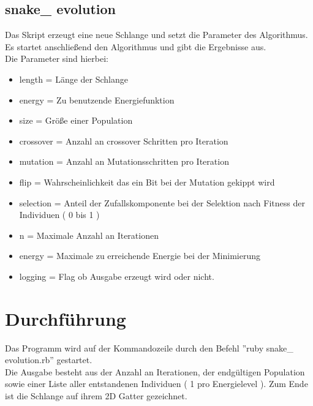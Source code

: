 \documentclass[a4paper,10pt,fleqn]{scrartcl}
\begin{document}
\subsection{snake\_ evolution}
Das Skript erzeugt eine neue Schlange und setzt die Parameter des Algorithmus. Es startet anschließend den Algorithmus und gibt die Ergebnisse aus. \\
Die Parameter sind hierbei:
\begin{itemize}
\item length = Länge der Schlange
\item energy = Zu benutzende Energiefunktion
\item size = Größe einer Population
\item crossover = Anzahl an crossover Schritten pro Iteration
\item mutation = Anzahl an Mutationsschritten pro Iteration
\item flip = Wahrscheinlichkeit das ein Bit bei der Mutation gekippt wird
\item selection =  Anteil der Zufallskomponente bei der Selektion nach Fitness der Individuen ( 0 bis 1 )
\item n = Maximale Anzahl an Iterationen
\item energy = Maximale zu erreichende Energie bei der Minimierung
\item logging = Flag ob Ausgabe erzeugt wird oder nicht.
\end{itemize}

\section{Durchführung}
Das Programm wird auf der Kommandozeile durch den Befehl ''ruby snake\_ evolution.rb'' gestartet.\\
Die Ausgabe besteht aus der Anzahl an Iterationen, der endgültigen Population sowie einer Liste aller entstandenen Individuen ( 1 pro Energielevel ). Zum Ende ist die Schlange auf ihrem 2D Gatter gezeichnet.
\end{document}
